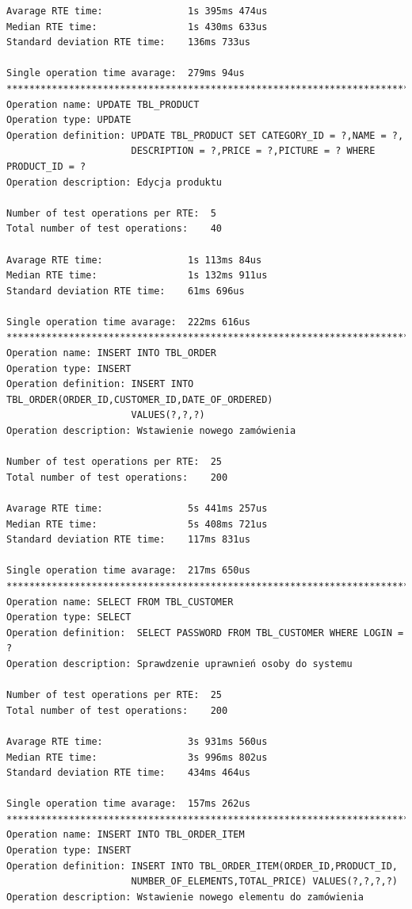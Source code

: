 \begin{Verbatim}
Avarage RTE time:               1s 395ms 474us
Median RTE time:                1s 430ms 633us
Standard deviation RTE time:    136ms 733us

Single operation time avarage:  279ms 94us
*********************************************************************************
Operation name: UPDATE TBL_PRODUCT
Operation type: UPDATE
Operation definition: UPDATE TBL_PRODUCT SET CATEGORY_ID = ?,NAME = ?,
                      DESCRIPTION = ?,PRICE = ?,PICTURE = ? WHERE PRODUCT_ID = ?
Operation description: Edycja produktu

Number of test operations per RTE:  5
Total number of test operations:    40

Avarage RTE time:               1s 113ms 84us
Median RTE time:                1s 132ms 911us
Standard deviation RTE time:    61ms 696us

Single operation time avarage:  222ms 616us
*********************************************************************************
Operation name: INSERT INTO TBL_ORDER
Operation type: INSERT
Operation definition: INSERT INTO TBL_ORDER(ORDER_ID,CUSTOMER_ID,DATE_OF_ORDERED) 
                      VALUES(?,?,?)
Operation description: Wstawienie nowego zamówienia

Number of test operations per RTE:  25
Total number of test operations:    200

Avarage RTE time:               5s 441ms 257us
Median RTE time:                5s 408ms 721us
Standard deviation RTE time:    117ms 831us

Single operation time avarage:  217ms 650us
*********************************************************************************
Operation name: SELECT FROM TBL_CUSTOMER
Operation type: SELECT
Operation definition:  SELECT PASSWORD FROM TBL_CUSTOMER WHERE LOGIN = ?
Operation description: Sprawdzenie uprawnień osoby do systemu

Number of test operations per RTE:  25
Total number of test operations:    200

Avarage RTE time:               3s 931ms 560us
Median RTE time:                3s 996ms 802us
Standard deviation RTE time:    434ms 464us

Single operation time avarage:  157ms 262us
*********************************************************************************
Operation name: INSERT INTO TBL_ORDER_ITEM
Operation type: INSERT
Operation definition: INSERT INTO TBL_ORDER_ITEM(ORDER_ID,PRODUCT_ID,
                      NUMBER_OF_ELEMENTS,TOTAL_PRICE) VALUES(?,?,?,?)
Operation description: Wstawienie nowego elementu do zamówienia


\end{Verbatim}
